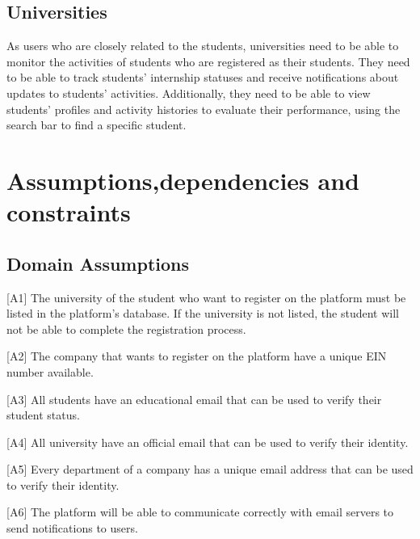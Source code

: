 \subsection{Universities}
As users who are closely related to the students, universities need to be able to monitor the activities of students who are registered as their students.
They need to be able to track students' internship statuses and receive notifications about updates to students' activities. Additionally, they need to 
be able to view students' profiles and activity histories to evaluate their performance, using the search bar to find a specific student.

\section{Assumptions,dependencies and constraints}\label{subsec:assumptions_dependencies_constraints}
\subsection{Domain Assumptions}
[A1] The university of the student who want to register on the platform must be listed in the platform's database. If the university is not listed, the student
will not be able to complete the registration process.

[A2] The company that wants to register on the platform have a unique EIN number available.

[A3] All students have an educational email that can be used to verify their student status.

[A4] All university have an official email that can be used to verify their identity.

[A5] Every department of a company has a unique email address that can be used to verify their identity.

[A6] The platform will be able to communicate correctly with email servers to send notifications to users.
